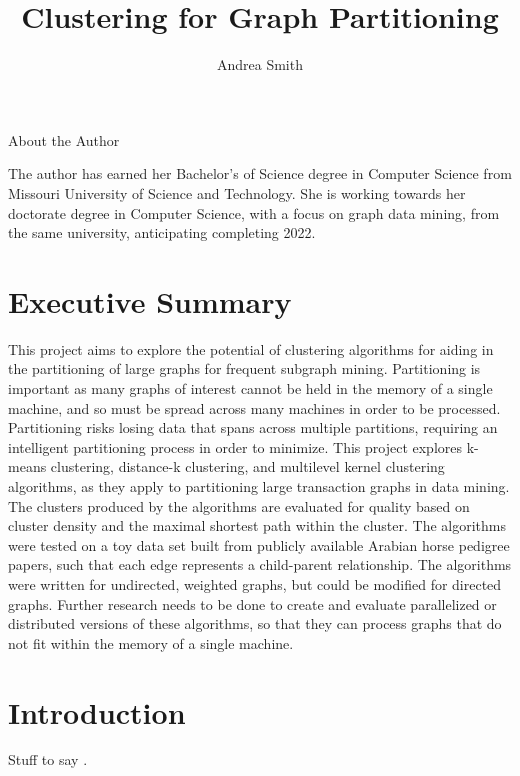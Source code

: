 \documentclass[12pt]{article}
\title{Clustering for Graph Partitioning}
\author{Andrea Smith}
\begin{document}
\begin{titlingpage}
\setlength{\droptitle}{30pt}
\maketitle
\begin{center}
{\selectfont
\large\centerline{About the Author}
}
The author has earned her Bachelor's of Science degree in Computer Science from Missouri University of Science and Technology. She is working towards her doctorate degree in Computer Science, with a focus on graph data mining, from the same university, anticipating completing 2022.
\end{center}
\end{titlingpage}

\tableofcontents

\newpage
\section{Executive Summary}
This project aims to explore the potential of clustering algorithms for aiding in the partitioning of large graphs for frequent subgraph mining. Partitioning is important as many graphs of interest cannot be held in the memory of a single machine, and so must be spread across many machines in order to be processed. Partitioning risks losing data that spans across multiple partitions, requiring an intelligent partitioning process in order to minimize. 
\newline\newline
This project explores k-means clustering, distance-k clustering, and multilevel kernel clustering algorithms, as they apply to partitioning large transaction graphs in data mining. The clusters produced by the algorithms are evaluated for quality based on cluster density and the maximal shortest path within the cluster. The algorithms were tested on a toy data set built from publicly available Arabian horse pedigree papers, such that each edge represents a child-parent relationship. The algorithms were written for undirected, weighted graphs, but could be modified for directed graphs.
\newline\newline
Further research needs to be done to create and evaluate parallelized or distributed versions of these algorithms, so that they can process graphs that do not fit within the memory of a single machine.

\newpage
\section{Introduction}
Stuff to say \cite{kernel,distK}.
\end{document}
